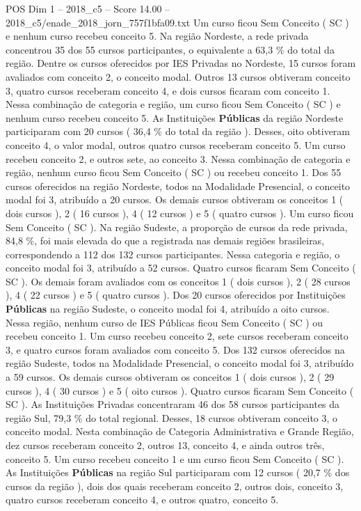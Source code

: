 \begin{textsample}{POS Dim 1 – 2018\_c5 – Score 14.00 – 2018\_c5/enade\_2018\_jorn\_757f1bfa09.txt}
Um curso ficou Sem Conceito ( SC ) e nenhum curso recebeu conceito 5.
Na região Nordeste, a rede privada concentrou 35 dos 55 cursos participantes, o equivalente a 63,3 \% do total da região.
Dentre os cursos oferecidos por IES Privadas no Nordeste, 15 cursos foram avaliados com conceito 2, o conceito modal.
Outros 13 cursos obtiveram conceito 3, quatro cursos receberam conceito 4, e dois cursos ficaram com conceito 1.
Nessa combinação de categoria e região, um curso ficou Sem Conceito ( SC ) e nenhum curso recebeu conceito 5.
As Instituições \textbf{Públicas} da região Nordeste participaram com 20 cursos ( 36,4 \% do total da região ).
Desses, oito obtiveram conceito 4, o valor modal, outros quatro cursos receberam conceito 5.
Um curso recebeu conceito 2, e outros sete, ao conceito 3.
Nessa combinação de categoria e região, nenhum curso ficou Sem Conceito ( SC ) ou recebeu conceito 1.
Dos 55 cursos oferecidos na região Nordeste, todos na Modalidade Presencial, o conceito modal foi 3, atribuído a 20 cursos.
Os demais cursos obtiveram os conceitos 1 ( dois cursos ), 2 ( 16 cursos ), 4 ( 12 cursos ) e 5 ( quatro cursos ).
Um curso ficou Sem Conceito ( SC ).
Na região Sudeste, a proporção de cursos da rede privada, 84,8 \%, foi mais elevada do que a registrada nas demais regiões brasileiras, correspondendo a 112 dos 132 cursos participantes.
Nessa categoria e região, o conceito modal foi 3, atribuído a 52 cursos.
Quatro cursos ficaram Sem Conceito ( SC ).
Os demais foram avaliados com os conceitos 1 ( dois cursos ), 2 ( 28 cursos ), 4 ( 22 cursos ) e 5 ( quatro cursos ).
Dos 20 cursos oferecidos por Instituições \textbf{Públicas} na região Sudeste, o conceito modal foi 4, atribuído a oito cursos.
Nessa região, nenhum curso de IES Públicas ficou Sem Conceito ( SC ) ou recebeu conceito 1.
Um curso recebeu conceito 2, sete cursos receberam conceito 3, e quatro cursos foram avaliados com conceito 5.
Dos 132 cursos oferecidos na região Sudeste, todos na Modalidade Presencial, o conceito modal foi 3, atribuído a 59 cursos.
Os demais cursos obtiveram os conceitos 1 ( dois cursos ), 2 ( 29 cursos ), 4 ( 30 cursos ) e 5 ( oito cursos ).
Quatro cursos ficaram Sem Conceito ( SC ).
As Instituições Privadas concentraram 46 dos 58 cursos participantes da região Sul, 79,3 \% do total regional.
Desses, 18 cursos obtiveram conceito 3, o conceito modal.
Nesta combinação de Categoria Administrativa e Grande Região, dez cursos receberam conceito 2, outros 13, conceito 4, e ainda outros três, conceito 5.
Um curso recebeu conceito 1 e um curso ficou Sem Conceito ( SC ).
As Instituições \textbf{Públicas} na região Sul participaram com 12 cursos ( 20,7 \% dos cursos da região ), dois dos quais receberam conceito 2, outros dois, conceito 3, quatro cursos receberam conceito 4, e outros quatro, conceito 5.

\end{textsample}
